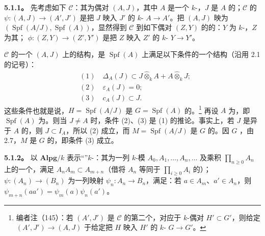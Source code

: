 \textbf{5.1.1。} 先考虑如下 $\mathcal C$：其为偶对 $(A,J)$，其中 $A$ 是一个 $k$-，$J$ 是 $A$ 的；$\mathcal C$ 的 $\psi:(A,J)\to(A',J')$ 是把 $J$ 映入 $J'$ 的 $k$- $A\to A'$。把 $(A,J)$ 映为 $(\operatorname{Spf}(A/J),\operatorname{Spf}(A))$，显然得到 $\mathcal C$ 到如下偶对 $(Z,Y)$ 的的：$Y$ 为 $k$-，$Z$ 为其； $\phi:(Z,Y)\to(Z',Y')$ 是把 $Z$ 映入 $Z'$ 的 $k$- $Y\to Y'$。

$\mathcal C$ 的一个 $(A,J)$ 上的结构，是 $\operatorname{Spf}(A)$ 上满足以下条件的一个结构（沿用 2.1 的记号）：
\[
\begin{aligned}
{}&(1)\quad\Delta_A(J)\subset J\widehat\otimes_k A+A\widehat\otimes_kJ;\\
&(2)\quad\varepsilon_A(J)=0;\\
&(3)\quad c_A(J)\subset J.
\end{aligned}
\]
这些条件也就是说，$H=\operatorname{Spf}(A/J)$ 是 $G=\operatorname{Spf}(A)$ 的。\footnote{编者注（145）：若 $(A',J')$ 是 $\mathcal C$ 的第二个，对应于 $k$-偶对 $H'\subset G'$，则给定 $(A',J')\to(A,J)$ 于给定把 $H$ 映入 $H'$ 的 $k$- $G\to G'$。}
再设 $A$ 为，即 $\operatorname{Spf}(A)$ 为。则当 $J\ne A$ 时，条件 (2)、(3) 是 (1) 的推论。事实上，若 $J$ 是异于 $A$ 的，则 $J\subset I_A$，所以 (2) 成立，而 $M=\operatorname{Spf}(A/J)$ 是 $G$ 的。因 $G$ ，由 2.7，$M$ 是 $G$ 的，即条件 (3) 成立。

\textbf{5.1.2。} 以 $\mathbf{Alpg}/k$ 表示“”$k$-：其为一列 $k$-模 $A_0,A_1,\ldots,A_n,\ldots$ 及乘积 $\prod_{n\geq0}A_n$ 上的一个，满足 $A_nA_m\subset A_{m+n}$（借将 $A_n$ 等同于 $\prod_{i\geq0}A_i$ 的）； $\psi:(A_n)\to(B_n)$ 为一列映射 $\psi_n:A_n\to B_n$，满足：若 $a\in A_m$、$a'\in A_n$，则 $\psi_{m+n}(aa')=\psi_m(a)\psi_n(a')$。

